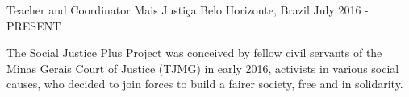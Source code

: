

\begin{cventries}

  \cventry
    {Teacher and Coordinator} %
    {Mais Justiça} %
    {Belo Horizonte, Brazil} %
    {July 2016 - PRESENT} %
    {
      \begin{cvitems} %
        \item {The Social Justice Plus Project was conceived by fellow civil servants of the Minas Gerais Court of Justice (TJMG) in early 2016, activists in various social causes, who decided to join forces to build a fairer society, free and in solidarity.}
      \end{cvitems}
    }

\end{cventries}
